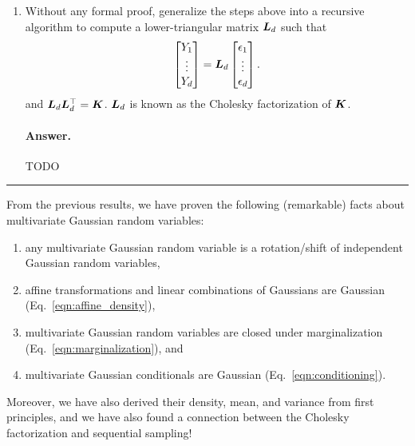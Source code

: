 \documentclass[11pt,letterpaper]{article}
\newcommand{\sectionbreak}{%
  \vspace{1em}
  \hrule
}
\newenvironment{answer}{%
    \vspace{1em}
    \color{black}
    \paragraph{Answer.}
  }{%
    \vspace{1em}
  }
\begin{document}
\begin{enumerate}
\begin{answer}
  TODO
\end{answer}

  \item
    Without any formal proof,
    generalize the steps above into a recursive algorithm to compute a lower-triangular matrix ${\bm{L}}_d$
    such that
    $$
      \begin{bmatrix} Y_1 \\ \vdots \\ Y_d \end{bmatrix}
      =
      {\bm{L}}_d
      \begin{bmatrix} \epsilon_1 \\ \vdots \\ \epsilon_d \end{bmatrix}.
    $$
    and ${\bm{L}}_d {\bm{L}}_d^\top = {\bm{K}}$.
    ${\bm{L}}_d$ is known as the Cholesky factorization of ${\bm{K}}$.

\begin{answer}
  TODO
\end{answer}

\end{enumerate}



\sectionbreak

From the previous results, we have proven the following (remarkable) facts about multivariate Gaussian random variables:
%
\begin{enumerate}
  \item any multivariate Gaussian random variable is a rotation/shift of independent Gaussian random variables,
  \item affine transformations and linear combinations of Gaussians are Gaussian (Eq.~\ref{eqn:affine_density}),
  \item multivariate Gaussian random variables are closed under marginalization (Eq.~\ref{eqn:marginalization}), and
  \item multivariate Gaussian conditionals are Gaussian (Eq.~\ref{eqn:conditioning}).
\end{enumerate}
%
Moreover, we have also derived their density, mean, and variance from first principles,
and we have also found a connection between the Cholesky factorization and sequential sampling!
\end{document}
